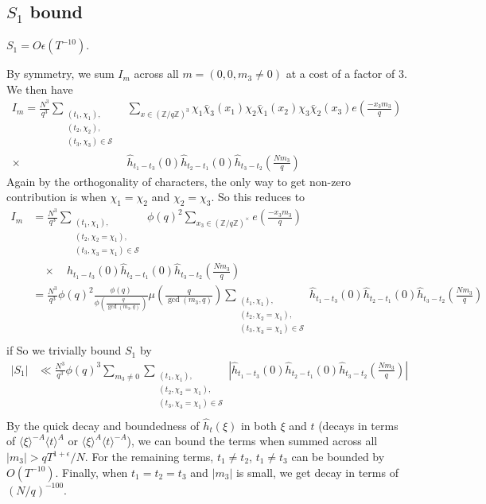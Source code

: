 \subsection{$S_1$ bound}
\begin{proposition}
    $S_1=O\epsilon(T^{-10})$.
\end{proposition}
By symmetry, we sum $I_m$ across all $m=(0,0,m_3\neq 0)$ at a cost of a factor of $3$.
We then have \begin{align*}
    I_m=\frac{N^3}{q^3}\sum_{\substack{(t_1,\chi_1),\\(t_2,\chi_2),\\(t_3,\chi_3)\in\mathcal{S}}} &\sum_{x\in (\mathbb{Z}/q\mathbb{Z})^3}\chi_1\bar{\chi}_3(x_1)\chi_2\bar{\chi}_1(x_2)\chi_3\bar{\chi}_2(x_3) e\left(\frac{-x_3 m_3}{q}\right)\\
    \times \ &\hat{h}_{t_1-t_3}\left(0\right)\hat{h}_{t_2-t_1}\left(0\right)\hat{h}_{t_3-t_2}\left(\frac{Nm_3}{q}\right)
\end{align*}
Again by the orthogonality of characters, the only way to get non-zero contribution is when $\chi_1=\chi_2$ and $\chi_2=\chi_3$. So this reduces to\begin{align*}
    I_m&=\frac{N^3}{q^3}\sum_{\substack{(t_1,\chi_1),\\(t_2,\chi_2=\chi_1),\\(t_3,\chi_3=\chi_1)\in\mathcal{S}}} \ \phi(q)^2 \sum_{x_3\in (\mathbb{Z}/q\mathbb{Z})^{\times}}e\left(\frac{-x_3 m_3}{q}\right)\\
   & \quad  \times  \quad {h}_{t_1-t_3}\left(0\right)\hat{h}_{t_2-t_1}\left(0\right)\hat{h}_{t_3-t_2}\left(\frac{Nm_3}{q}\right)\\
   &=\frac{N^3}{q^3}\phi(q)^2 \frac{\phi(q)}{\phi\left(\frac{q}{\gcd(m_3,q)}\right)}\mu\left(\frac{q}{\gcd(m_3,q)}\right) \sum_{\substack{(t_1,\chi_1),\\(t_2,\chi_2=\chi_1),\\(t_3,\chi_3=\chi_1)\in\mathcal{S}}} \hat{h}_{t_1-t_3}\left(0\right)\hat{h}_{t_2-t_1}\left(0\right)\hat{h}_{t_3-t_2}\left(\frac{Nm_3}{q}\right)\\
\end{align*}
if 
So we trivially bound $S_1$ by\begin{align*}
    |S_1|&\ll  \frac{N^3}{q^3} \phi(q)^3 \sum_{m_3\neq 0}\sum_{\substack{(t_1,\chi_1),\\(t_2,\chi_2=\chi_1),\\(t_3,\chi_3=\chi_1)\in\mathcal{S}}}
   \left|\hat{h}_{t_1-t_3}\left(0\right)\hat{h}_{t_2-t_1}\left(0\right)\hat{h}_{t_3-t_2}\left(\frac{Nm_3}{q}\right)\right|\\
\end{align*}
By the quick decay and boundedness of $\hat{h}_t(\xi)$ in both $\xi$ and $t$ (decays in terms of $\langle \xi \rangle^{-A}\langle t \rangle^A $ or $ \langle \xi \rangle^A\langle t \rangle^{-A} $), we can bound the terms when summed across all $|m_3|>qT^{1+\epsilon}/N$. For the remaining terms, $t_1\neq t_2$, $t_1\neq t_3$ can be bounded by $O(T^{-10})$.
Finally, when $t_1=t_2=t_3$ and $|m_3|$ is small, we get decay in terms of $(N/q)^{-100}$. 

